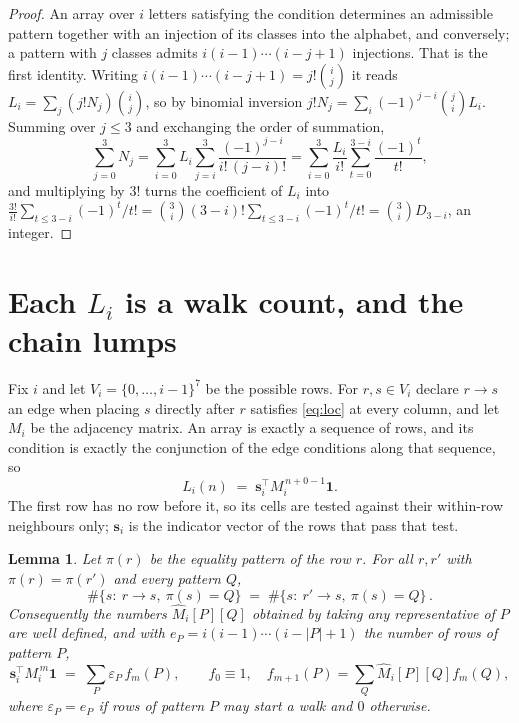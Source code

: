 \documentclass[11pt,a4paper]{article}
\theoremstyle{plain}
\newtheorem{lemma}[theorem]{Lemma}
\theoremstyle{definition}
\begin{document}
\begin{proof}
An array over $i$ letters satisfying the condition determines an admissible pattern together
with an injection of its classes into the alphabet, and conversely; a pattern with $j$
classes admits $i(i-1)\cdots(i-j+1)$ injections. That is the first identity. Writing
$i(i-1)\cdots(i-j+1)=j!\binom{i}{j}$ it reads $L_i=\sum_j (j!N_j)\binom{i}{j}$, so by
binomial inversion $j!N_j=\sum_{i}(-1)^{j-i}\binom{j}{i}L_i$. Summing over
$j\le 3$ and exchanging the order of summation,
\[
\sum_{j=0}^{3}N_j=\sum_{i=0}^{3}L_i\sum_{j=i}^{3}\frac{(-1)^{j-i}}{i!\,(j-i)!}
=\sum_{i=0}^{3}\frac{L_i}{i!}\sum_{t=0}^{3-i}\frac{(-1)^t}{t!} ,
\]
and multiplying by $3!$ turns the coefficient of $L_i$ into
$\frac{3!}{i!}\sum_{t\le 3-i}(-1)^t/t!=\binom{3}{i}(3-i)!\sum_{t\le 3-i}(-1)^t/t!
=\binom{3}{i}D_{3-i}$, an integer.
\end{proof}

\section{Each $L_i$ is a walk count, and the chain lumps}

Fix $i$ and let $V_i=\{0,\dots,i-1\}^{7}$ be the possible rows. For $r,s\in V_i$
declare $r\to s$ an edge when placing $s$ directly after $r$ satisfies \eqref{eq:loc} at
every column, and let $M_i$ be the adjacency matrix. An array is exactly a sequence of
rows, and its condition is exactly the conjunction of the edge conditions along that
sequence, so
\[
L_i(n)\;=\;\mathbf{s}_i^{\!\top}M_i^{\,n+0-1}\mathbf{1} .
\]
The first row has no row before it, so its cells are tested
against their within-row neighbours only; $\mathbf{s}_i$ is the indicator vector of the
rows that pass that test.

\begin{lemma}\label{lem:lump}
Let $\pi(r)$ be the equality pattern of the row $r$. For all $r,r'$ with
$\pi(r)=\pi(r')$ and every pattern $Q$,
\[
\#\{s:\ r\to s,\ \pi(s)=Q\}\;=\;\#\{s:\ r'\to s,\ \pi(s)=Q\}\, .
\]
Consequently the numbers $\widehat M_i[P][Q]$ obtained by taking any representative of $P$
are well defined, and with $e_P=i(i-1)\cdots(i-|P|+1)$ the number of rows of pattern $P$,
\[
\mathbf{s}_i^{\!\top}M_i^{\,m}\mathbf{1}\;=\;\sum_P \varepsilon_P\,f_m(P),
\qquad f_0\equiv1,\quad f_{m+1}(P)=\sum_Q\widehat M_i[P][Q]f_m(Q),
\]
where $\varepsilon_P=e_P$ if rows of pattern $P$ may start a walk and $0$ otherwise.
\end{lemma}
\end{document}
